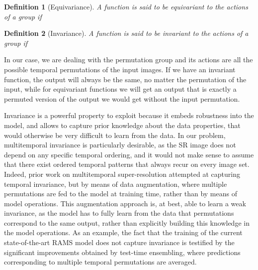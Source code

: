 \documentclass[journal]{IEEEtran}
\newtheorem{definition}{Definition}[section]
\begin{document}
\begin{definition}[Equivariance]
A function  is said to be \textit{equivariant} to the actions  of a group  if

\end{definition} 

\begin{definition}[Invariance]
A function  is said to be \textit{invariant} to the actions  of a group  if

\end{definition} 

In our case, we are dealing with the permutation group and its actions are all the possible temporal permutations of the input images. If we have an invariant function, the output will always be the same, no matter the permutation of the input, while for equivariant functions we will get an output that is exactly a permuted version of the output we would get without the input permutation. 

Invariance is a powerful property to exploit because it embeds robustness into the model, and allows to capture prior knowledge about the data properties, that would otherwise be very difficult to learn from the data. In our problem, multitemporal invariance is particularly desirable, as the SR image does not depend on any specific temporal ordering, and it would not make sense to assume that there exist ordered temporal patterns that always recur on every image set. Indeed, prior work on multitemporal super-resolution \cite{salvetti2020multi} attempted at capturing temporal invariance, but by means of data augmentation, where multiple permutations are fed to the model at training time, rather than by means of model operations. This augmentation approach is, at best, able to learn a weak invariance, as the model has to fully learn from the data that permutations correspond to the same output, rather than explicitly building this knowledge in the model operations. As an example, the fact that the training of the current state-of-the-art RAMS model \cite{salvetti2020multi} does not capture invariance is testified by the significant improvements obtained by test-time ensembling, where predictions corresponding to multiple temporal permutations are averaged.
\end{document}
